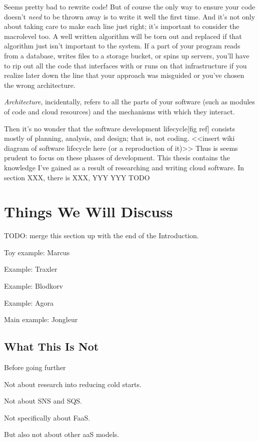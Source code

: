 \documentclass{article}
\newcommand{\term}[1]{\textit{#1}}
\begin{document}
Seems pretty bad to rewrite code!
But of course the only way to ensure your code doesn't \textit{need} to be thrown away is to write it well the first time.
And it's not only about taking care to make each line just right; it's important to consider the macrolevel too.
A well written algorithm will be torn out and replaced if that algorithm just isn't important to the system.
If a part of your program reads from a database, writes files to a storage bucket, or spins up servers, you'll have to rip out all the code that interfaces with or runs on that infrastructure if you realize later down the line that your approach was misguided or you've chosen the wrong architecture.

\term{Architecture}, incidentally, refers to all the parts of your software (such as modules of code and cloud resources) and the mechanisms with which they interact.

Then it's no wonder that the software development lifecycle[fig ref] consists mostly of planning, analysis, and design; that is, not coding.
<<insert wiki diagram of software lifecycle here (or a reproduction of it)>>
Thus is seems prudent to focus on these phases of development.
This thesis contains the knowledge I've gained as a result of researching and writing cloud software.
In section XXX, there is XXX, YYY YYY TODO

\section{Things We Will Discuss}

TODO: merge this section up with the end of the Introduction.

Toy example: Marcus

Example: Traxler

Example: Blodkorv

Example: Agora

Main example: Jongleur

\subsection{What This Is Not}

Before going further

Not about research into reducing cold starts.

Not about SNS and SQS.

Not specifically about FaaS.

But also not about other aaS models.
\end{document}
